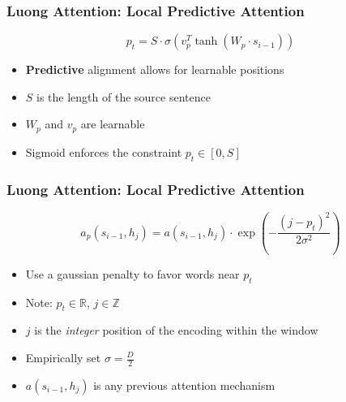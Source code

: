 \documentclass[usenames,dvipsnames]{beamer}
\begin{document}
\begin{frame}
  \frametitle{Luong Attention: Local Predictive Attention}
  \begin{equation*}
    p_t = S \cdot \sigma \left( v_p^T \tanh \left( W_p \cdot s_{i-1} \right) \right)
  \end{equation*}
  \begin{itemize}
    \item \textbf{Predictive} alignment allows for learnable positions
    \item $S$ is the length of the source sentence
    \item $W_p$ and $v_p$ are learnable
    \item Sigmoid enforces the constraint $p_t \in \left[ 0, S \right]$
  \end{itemize}
\end{frame}

\begin{frame}
  \frametitle{Luong Attention: Local Predictive Attention}
  \begin{equation*}
    a_{p} \left( s_{i-1}, h_j \right) = a\left( s_{i-1}, h_j \right) \cdot \exp \left( -\frac{ \left(j - p_t\right)^{2} }{2\sigma^2} \right)
  \end{equation*}
  \begin{itemize}
    \item Use a gaussian penalty to favor words near $p_t$
    \item Note: $p_t \in \mathbb{R}$, $j \in \mathbb{Z}$
    \item $j$ is the \textit{integer} position of the encoding within the window
    \item Empirically set $\sigma = \frac{D}{2}$
    \item $a\left( s_{i-1}, h_j \right)$ is any previous attention mechanism
  \end{itemize}
\end{frame}
\end{document}
